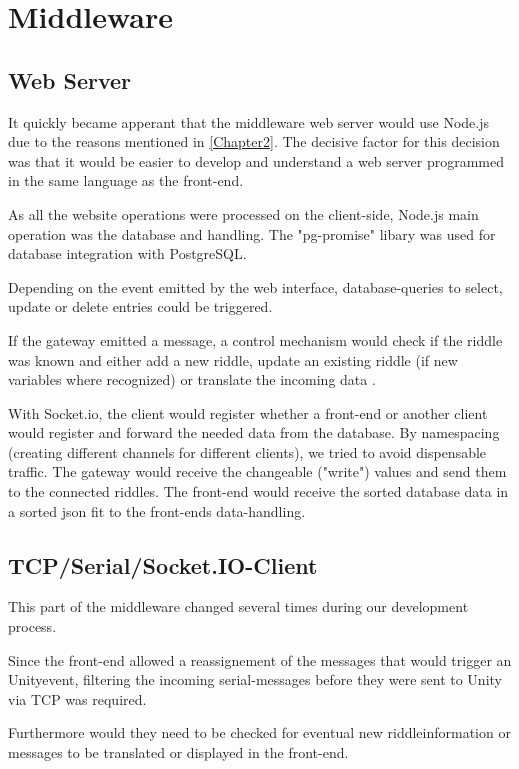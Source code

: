 \section{Middleware}

\subsection{Web Server}
It quickly became apperant that the middleware web server would use Node.js due to the reasons mentioned in \ref{Chapter2}.
The decisive factor for this decision was that it would be easier to develop and understand a web server programmed in the same language as the front-end.

As all the website operations were processed on the client-side, Node.js main operation was the database and handling.
The "pg-promise" libary \parencite{pg-promise} was used for database integration with PostgreSQL.

Depending on the event emitted by the web interface, database-queries to select, update or delete entries could be triggered.

If the gateway emitted a message, a control mechanism would check if the riddle was known and either add a new riddle, update an existing riddle (if new variables where recognized) or translate the incoming data .

With Socket.io, the client would register whether a front-end or another client would register and forward the needed data from the database.
By namespacing (creating different channels for different clients), we tried to avoid dispensable traffic.
The gateway would receive the changeable ("write") values and send them to the connected riddles.
The front-end would receive the sorted database data in a sorted json fit to the front-ends data-handling.

\subsection{TCP/Serial/Socket.IO-Client}
This part of the middleware changed several times during our development process.

Since the front-end allowed a reassignement of the messages that would trigger an Unityevent, 
filtering the incoming serial-messages before they were sent to Unity via TCP was required.

Furthermore would they need to be checked for eventual new riddleinformation or messages to be translated or displayed in the front-end.

